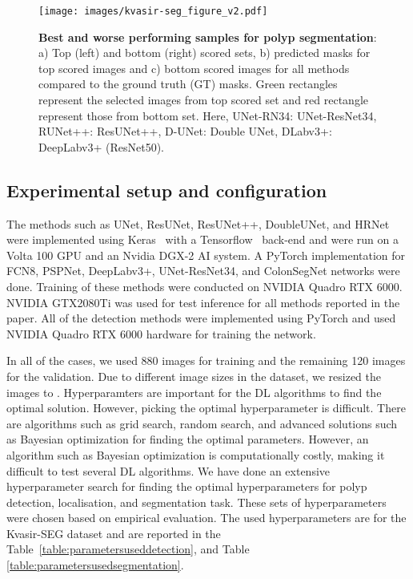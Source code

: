 \documentclass[journal]{IEEEtran}
\begin{document}
\begin{figure*}
    \centering
\texttt{[image: images/kvasir-seg\_figure\_v2.pdf]}
    \caption{\textbf{Best and worse performing samples for polyp segmentation}: a) Top (left) and bottom (right) scored sets, b) predicted masks for top scored images and c) bottom scored images for all methods compared to the ground truth (GT) masks. Green rectangles represent the selected images from top scored set and red rectangle represent those from bottom set. Here, UNet-RN34: UNet-ResNet34, RUNet++: ResUNet++, D-UNet: Double UNet, DLabv3+: DeepLabv3+ (ResNet50).}
    \label{fig:bestandworst}
\end{figure*}
\subsection{Experimental setup and configuration}
The methods such as UNet, ResUNet, ResUNet++, DoubleUNet, and HRNet were implemented using Keras~\cite{chollet2015keras} with a Tensorflow~\cite{abadi2016tensorflow} back-end and were run on a Volta 100 GPU and an Nvidia DGX-2 AI system. A PyTorch  implementation for FCN8, PSPNet, DeepLabv3+, UNet-ResNet34, and ColonSegNet networks were done. Training of these methods were conducted on NVIDIA Quadro RTX 6000. NVIDIA GTX2080Ti was used for test inference for all methods reported in the paper. All of the detection methods were implemented using PyTorch  and used  NVIDIA Quadro RTX 6000 hardware for training the network. 

In all of the cases, we used 880 images for training and the remaining 120 images for the validation. Due to different image sizes in the dataset, we resized the images to . Hyperparamters are important for the \ac{DL} algorithms to find the optimal solution. However, picking the optimal hyperparameter is difficult.  There are algorithms such as grid search, random search, and advanced solutions such as Bayesian optimization for finding the optimal parameters. However, an algorithm such as Bayesian optimization is computationally costly, making it difficult to test several \ac{DL} algorithms.  We have done an extensive hyperparameter search for finding the optimal hyperparameters for polyp detection, localisation, and segmentation task. These sets of hyperparameters were chosen based on empirical evaluation. The used hyperparameters are for the Kvasir-SEG dataset and are reported in the Table~\ref{table:parametersuseddetection}, and Table \ref{table:parametersusedsegmentation}. 
\end{document}
